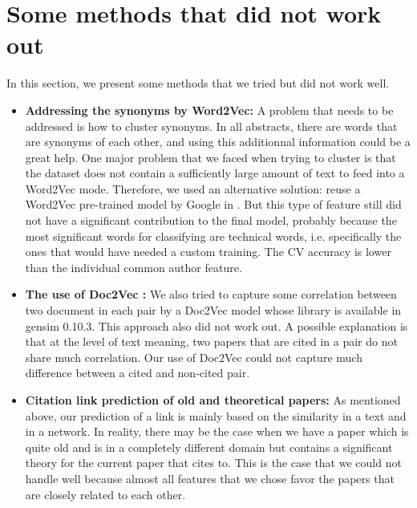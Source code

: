 \documentclass{article}
\begin{document}
\section{Some methods that did not work out}
\label{sec:notwork}
In this section, we present some methods that we tried but did not work well.
\begin{itemize}
\item \textbf{Addressing the synonyms by Word2Vec:} A problem that needs to be addressed is how to cluster synonyms. In all abstracts, there are words that are synonyms of each other, and using this additionnal information could be a great help. One major problem that we faced when trying to cluster is that the dataset does not contain a sufficiently large amount of text to feed into a Word2Vec mode. Therefore, we used an alternative solution: reuse a Word2Vec pre-trained model by Google in \cite{word2vecgg}. But this type of feature still did not have a significant contribution to the final model, probably because the most significant words for classifying are technical words, i.e. specifically the ones that would have needed a custom training. The CV accuracy is lower than the individual common author feature.
\item \textbf{The use of Doc2Vec \cite{DBLP:LeM14}:} We also tried to capture some correlation between two document in each pair by a Doc2Vec model whose library is available in gensim 0.10.3. This approach also did not work out. A possible explanation is that at the level of text meaning, two papers that are cited in a pair do not share much correlation. Our use of Doc2Vec could not capture much difference between a cited and non-cited pair.
\item \textbf{Citation link prediction of old and theoretical papers:} As mentioned above, our prediction of a link is mainly based on the similarity in a text and in a network. In reality, there may be the case when we have a paper which is quite old and is in a completely different domain but contains a significant theory for the current paper that cites to. This is the case that we could not handle well because almost all features that we chose favor the papers that are closely related to each other.
\end{itemize}
\end{document}
